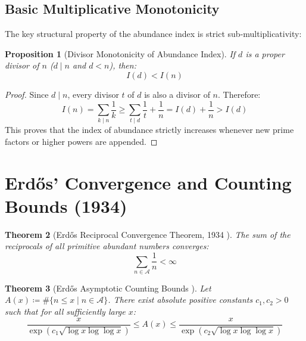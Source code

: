 \documentclass[11pt,a4paper]{article}
\newtheorem{theorem}{Theorem}[section]
\newtheorem{proposition}[theorem]{Proposition}
\theoremstyle{definition}
\begin{document}
\subsection{Basic Multiplicative Monotonicity}
The key structural property of the abundance index is strict sub-multiplicativity:

\begin{proposition}[Divisor Monotonicity of Abundance Index]\label{prop:divisor_monotone}
If $d$ is a proper divisor of $n$ ($d \mid n$ and $d < n$), then:
\begin{equation}\label{eq:strict_ineq_index}
I(d) < I(n)
\end{equation}
\end{proposition}

\begin{proof}
Since $d \mid n$, every divisor $t$ of $d$ is also a divisor of $n$.
Therefore:
\[ I(n) = \sum_{k \mid n} \frac{1}{k} \ge \sum_{t \mid d} \frac{1}{t} + \frac{1}{n} = I(d) + \frac{1}{n} > I(d) \]
This proves that the index of abundance strictly increases whenever new prime factors or higher powers are appended.
\end{proof}

\section{Erd\H{o}s' Convergence and Counting Bounds (1934)}

\begin{theorem}[Erd\H{o}s Reciprocal Convergence Theorem, 1934 \cite{erdos1934}]\label{thm:erdos_reciprocal}
The sum of the reciprocals of all primitive abundant numbers converges:
\begin{equation}\label{eq:reciprocal_converges}
\sum_{n \in \mathcal{A}} \frac{1}{n} < \infty
\end{equation}
\end{theorem}

\begin{theorem}[Erd\H{o}s Asymptotic Counting Bounds \cite{erdos1934}]\label{thm:erdos_counting}
Let $A(x) \coloneqq \# \{ n \le x \mid n \in \mathcal{A} \}$.
There exist absolute positive constants $c_1, c_2 > 0$ such that for all sufficiently large $x$:
\begin{equation}\label{eq:counting_bounds}
\frac{x}{\exp(c_1 \sqrt{\log x \log \log x})} \le A(x) \le \frac{x}{\exp(c_2 \sqrt{\log x \log \log x})}
\end{equation}
\end{theorem}
\end{document}
